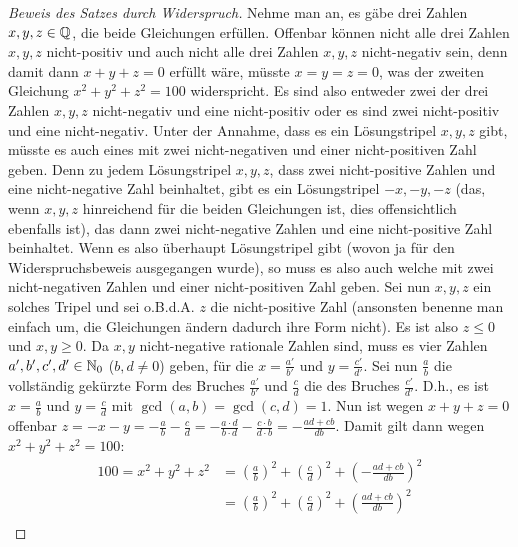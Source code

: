 \begin{proof}[Beweis des Satzes durch Widerspruch]
    Nehme man an, es gäbe drei Zahlen $x, y, z \in \mathbb{Q}$, die beide Gleichungen erfüllen. Offenbar können nicht alle 
    drei Zahlen $x, y, z$ nicht-positiv und auch nicht alle drei Zahlen $x, y, z$ nicht-negativ sein, denn damit 
    dann $x+y+z = 0$ erfüllt wäre, müsste $x = y = z = 0$, was der zweiten Gleichung $x^2+y^2+z^2 = 100$ 
    widerspricht. Es sind also entweder zwei der drei Zahlen $x, y, z$ nicht-negativ und eine nicht-positiv oder es 
    sind zwei nicht-positiv und eine nicht-negativ. Unter der Annahme, dass es ein Lösungstripel $x, y, z$ gibt, 
    müsste es auch eines mit zwei nicht-negativen und einer nicht-positiven Zahl geben. Denn zu jedem Lösungstripel 
    $x, y, z$, dass zwei nicht-positive Zahlen und eine nicht-negative Zahl beinhaltet, gibt es ein Lösungstripel 
    $-x,-y,-z$ (das, wenn $x, y, z$ hinreichend für die beiden Gleichungen ist, dies offensichtlich ebenfalls ist), 
    das dann zwei nicht-negative Zahlen und eine nicht-positive Zahl beinhaltet. Wenn es also überhaupt 
    Lösungstripel gibt (wovon ja für den Widerspruchsbeweis ausgegangen wurde), so muss es also auch welche mit zwei 
    nicht-negativen Zahlen und einer nicht-positiven Zahl geben. Sei nun $x, y, z$ ein solches Tripel und sei 
    o.B.d.A. $z$ die nicht-positive Zahl (ansonsten benenne man einfach um, die Gleichungen ändern dadurch ihre Form 
    nicht). Es ist also $z \leq 0$ und $x, y \geq 0$. Da $x, y$ nicht-negative rationale Zahlen sind, muss es vier 
    Zahlen $a', b', c', d' \in \mathbb{N}_0$ ($b, d \neq 0$) geben, für die $x = \frac{a'}{b'}$ und $y = \frac{c'}{d'}$. 
    Sei nun $\frac{a}{b}$ die vollständig gekürzte Form des Bruches $\frac{a'}{b'}$ und $\frac{c}{d}$ die des 
    Bruches $\frac{c'}{d'}$. D.h., es ist $x = \frac{a}{b}$ und $y = \frac{c}{d}$ mit $\gcd(a, b) = \gcd(c, d) = 1$. 
    Nun ist wegen $x+y+z=0$ offenbar $z = -x-y = -\frac{a}{b} - \frac{c}{d} = -\frac{a \cdot d}{b \cdot d} - 
    \frac{c \cdot b}{d \cdot b} = - \frac{ad+cb}{db}$. Damit gilt dann wegen $x^2+y^2+z^2 = 100$:
    \begin{align*}
        100 = x^2+y^2+z^2 &= \left( \frac{a}{b} \right)^2 + \left( \frac{c}{d} \right)^2 + \left( -\frac{ad+cb}{db} \right)^2\\
        &= \left( \frac{a}{b} \right)^2 + \left( \frac{c}{d} \right)^2 + \left( \frac{ad+cb}{db} \right)^2\\

\end{align*}
\end{proof}
